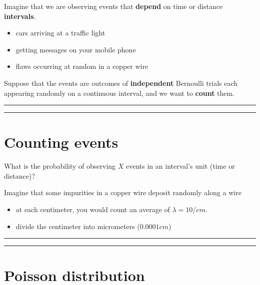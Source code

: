 \documentclass[
]{book}
\providecommand{\tightlist}{%
  \setlength{\itemsep}{0pt}\setlength{\parskip}{0pt}}
\begin{document}
Imagine that we are observing events that \textbf{depend} on time or distance \textbf{intervals}.

\begin{itemize}
\tightlist
\item
  cars arriving at a traffic light
\item
  getting messages on your mobile phone
\item
  flaws occurring at random in a copper wire
\end{itemize}

Suppose that the events are outcomes of \textbf{independent} Bernoulli trials each appearing randomly on a continuous interval, and we want to \textbf{count} them.

\begin{center}\rule{0.5\linewidth}{0.5pt}\end{center}

\begin{center}\rule{0.5\linewidth}{0.5pt}\end{center}

\hypertarget{counting-events-1}{%
\section{Counting events}\label{counting-events-1}}

What is the probability of observing \(X\) events in an interval's unit (time or distance)?

Imagine that some impurities in a copper wire deposit randomly along a wire

\begin{itemize}
\tightlist
\item
  at each centimeter, you would count an average of \(\lambda=10/cm\).
\item
  divide the centimeter into micrometers (\(0.0001cm\))
\end{itemize}

\begin{center}\rule{0.5\linewidth}{0.5pt}\end{center}

\begin{center}\rule{0.5\linewidth}{0.5pt}\end{center}

\hypertarget{poisson-distribution}{%
\section{Poisson distribution}\label{poisson-distribution}}
\end{document}
